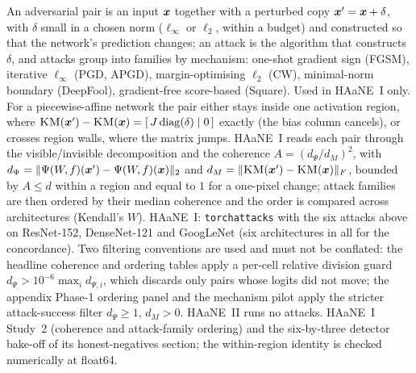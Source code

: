 {An adversarial pair is an input $\boldsymbol{x}$ together with a perturbed copy $\boldsymbol{x}'=\boldsymbol{x}+\delta$, with $\delta$ small in a chosen norm ($\ell_\infty$ or $\ell_2$, within a budget) and constructed so that the network's prediction changes; an attack is the algorithm that constructs $\delta$, and attacks group into families by mechanism: one-shot gradient sign (FGSM), iterative $\ell_\infty$ (PGD, APGD), margin-optimising $\ell_2$ (CW), minimal-norm boundary (DeepFool), gradient-free score-based (Square). Used in HAaNE~I only.}
{For a piecewise-affine network the pair either stays inside one activation region, where $\textsc{KM}(\boldsymbol{x}')-\textsc{KM}(\boldsymbol{x})=[\,J\,\mathrm{diag}(\delta)\mid0\,]$ exactly (the bias column cancels), or crosses region walls, where the matrix jumps. HAaNE~I reads each pair through the visible/invisible decomposition and the coherence $A=(d_\Psi/d_M)^2$, with $d_\Psi=\|\Psi(W\!,f)(\boldsymbol{x}')-\Psi(W\!,f)(\boldsymbol{x})\|_2$ and $d_M=\|\textsc{KM}(\boldsymbol{x}')-\textsc{KM}(\boldsymbol{x})\|_F$, bounded by $A\le d$ within a region and equal to $1$ for a one-pixel change; attack families are then ordered by their median coherence and the order is compared across architectures (Kendall's $W$).}
{HAaNE~I: \texttt{torchattacks} with the six attacks above on ResNet-152, DenseNet-121 and GoogLeNet (six architectures in all for the concordance). Two filtering conventions are used and must not be conflated: the headline coherence and ordering tables apply a per-cell relative division guard $d_\Psi > 10^{-6}\max_i d_{\Psi,i}$, which discards only pairs whose logits did not move; the appendix Phase-1 ordering panel and the mechanism pilot apply the stricter attack-success filter $d_\Psi\ge1$, $d_M>0$. HAaNE~II runs no attacks.}
{HAaNE~I Study~2 (coherence and attack-family ordering) and the six-by-three detector bake-off of its honest-negatives section; the within-region identity is checked numerically at float64.}
